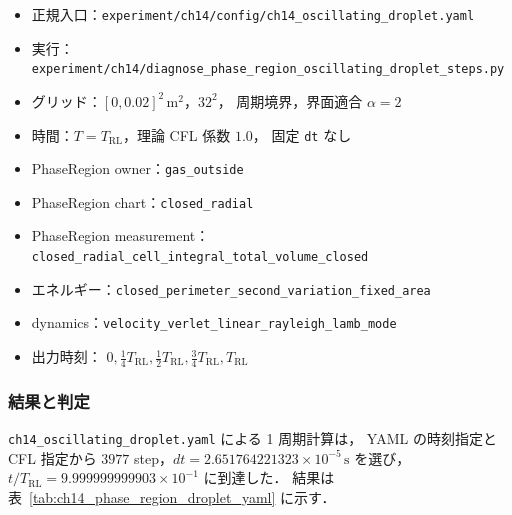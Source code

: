\begin{itemize}[noitemsep,leftmargin=2em]
  \item 正規入口：\texttt{experiment/ch14/config/ch14\_oscillating\_droplet.yaml}
  \item 実行：\texttt{experiment/ch14/diagnose\_phase\_region\_oscillating\_droplet\_steps.py}
  \item グリッド：$[0,0.02]^2\,\mathrm{m}^2$，$32^2$，
        周期境界，界面適合 $\alpha=2$
  \item 時間：$T=T_\mathrm{RL}$，理論 CFL 係数 $1.0$，
        固定 \texttt{dt} なし
  \item PhaseRegion owner：\texttt{gas\_outside}
  \item PhaseRegion chart：\texttt{closed\_radial}
  \item PhaseRegion measurement：
        \texttt{closed\_radial\_cell\_integral\_total\_volume\_closed}
  \item エネルギー：\texttt{closed\_perimeter\_second\_variation\_fixed\_area}
  \item dynamics：\texttt{velocity\_verlet\_linear\_rayleigh\_lamb\_mode}
  \item 出力時刻：
        $0,\frac14T_\mathrm{RL},\frac12T_\mathrm{RL},
        \frac34T_\mathrm{RL},T_\mathrm{RL}$
\end{itemize}

\subsubsection{結果と判定}

\texttt{ch14\_oscillating\_droplet.yaml} による 1 周期計算は，
YAML の時刻指定と CFL 指定から
$3977$ step，$dt=2.651764221323\times10^{-5}\,\mathrm{s}$ を選び，
$t/T_\mathrm{RL}=9.999999999903\times10^{-1}$ に到達した．
結果は表~\ref{tab:ch14_phase_region_droplet_yaml} に示す．

